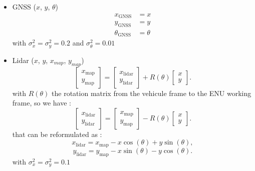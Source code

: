 \documentclass[conference]{IEEEtran}
\begin{document}
\vspace{2mm}
\begin{itemize}
    \item GNSS ($x$, $y$, $\theta$)
    \begin{align*}
        x_\text{GNSS} &= x \\
        y_\text{GNSS} &= y \\
        \theta_\text{GNSS} &= \theta
    \end{align*}
    with $\sigma_{x}^{2} = \sigma_{y}^{2} = 0.2$ and $\sigma_{\theta}^{2} = 0.01$ 
    
    \vspace{4mm}

    \item Lidar ($x$, $y$, $x_{map}$, $y_{map}$)
    \[
        \begin{bmatrix}
        x_\text{map} \\
        y_\text{map}
        \end{bmatrix}
        =
        \begin{bmatrix}
        x_\text{lidar} \\
        y_\text{lidar}
        \end{bmatrix}
        + R(\theta)
        \begin{bmatrix}
        x \\
        y
        \end{bmatrix}.
    \]
    with $R(\theta)$ the rotation matrix from the vehicule frame to the ENU working frame, so we have : 
    \[
        \begin{bmatrix}
        x_\text{lidar} \\
        y_\text{lidar}
        \end{bmatrix}
        =
        \begin{bmatrix}
        x_\text{map} \\
        y_\text{map}
        \end{bmatrix}
        - R(\theta)
        \begin{bmatrix}
        x \\
        y
        \end{bmatrix}.
    \]
    that can be reformulated as :
   \[
        x_\text{lidar} = x_\text{map} - x \cos(\theta) + y \sin(\theta),
        \]
        \[
        y_\text{lidar} = y_\text{map} - x \sin(\theta) - y \cos(\theta).
    \]
    with $\sigma_{x}^{2} = \sigma_y^2 = 0.1$
\end{itemize}

\vspace{4mm}
\end{document}
